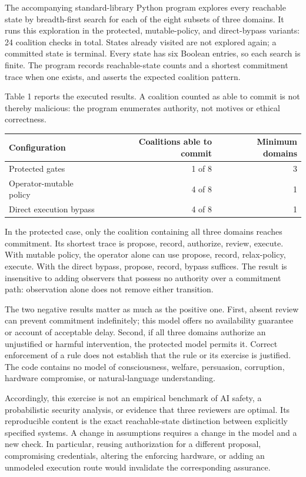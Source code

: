 \documentclass[11pt,a4paper]{article}
\begin{document}
The accompanying standard-library Python program explores every reachable state by breadth-first search for each of the eight subsets of three domains. It runs this exploration in the protected, mutable-policy, and direct-bypass variants: 24 coalition checks in total. States already visited are not explored again; a committed state is terminal. Every state has six Boolean entries, so each search is finite. The program records reachable-state counts and a shortest commitment trace when one exists, and asserts the expected coalition pattern.

Table 1 reports the executed results. A coalition counted as able to commit is not thereby malicious: the program enumerates authority, not motives or ethical correctness.

\begin{longtable}[]{@{}lrr@{}}
\toprule\noalign{}
Configuration & Coalitions able to commit & Minimum domains \\
\midrule\noalign{}
\endhead
\bottomrule\noalign{}
\endlastfoot
Protected gates & 1 of 8 & 3 \\
Operator-mutable policy & 4 of 8 & 1 \\
Direct execution bypass & 4 of 8 & 1 \\
\end{longtable}

In the protected case, only the coalition containing all three domains reaches commitment. Its shortest trace is propose, record, authorize, review, execute. With mutable policy, the operator alone can use propose, record, relax-policy, execute. With the direct bypass, propose, record, bypass suffices. The result is insensitive to adding observers that possess no authority over a commitment path: observation alone does not remove either transition.

The two negative results matter as much as the positive one. First, absent review can prevent commitment indefinitely; this model offers no availability guarantee or account of acceptable delay. Second, if all three domains authorize an unjustified or harmful intervention, the protected model permits it. Correct enforcement of a rule does not establish that the rule or its exercise is justified. The code contains no model of consciousness, welfare, persuasion, corruption, hardware compromise, or natural-language understanding.

Accordingly, this exercise is not an empirical benchmark of AI safety, a probabilistic security analysis, or evidence that three reviewers are optimal. Its reproducible content is the exact reachable-state distinction between explicitly specified systems. A change in assumptions requires a change in the model and a new check. In particular, reusing authorization for a different proposal, compromising credentials, altering the enforcing hardware, or adding an unmodeled execution route would invalidate the corresponding assurance.
\end{document}
